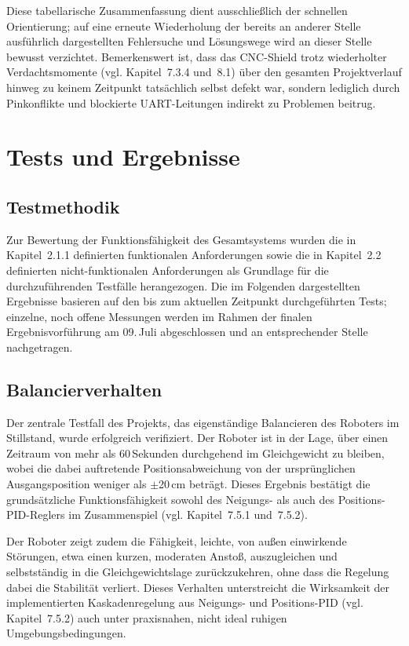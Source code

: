 \documentclass[12pt,ngerman,numbers=noenddot,abstracton,headsepline]{scrreprt}
\begin{document}
Diese tabellarische Zusammenfassung dient ausschließlich der schnellen Orientierung; auf eine erneute Wiederholung der bereits an anderer Stelle ausführlich dargestellten Fehlersuche und Lösungswege wird an dieser Stelle bewusst verzichtet. Bemerkenswert ist, dass das CNC-Shield trotz wiederholter Verdachtsmomente (vgl. Kapitel~7.3.4 und~8.1) über den gesamten Projektverlauf hinweg zu keinem Zeitpunkt tatsächlich selbst defekt war, sondern lediglich durch Pinkonflikte und blockierte UART-Leitungen indirekt zu Problemen beitrug.

\chapter{Tests und Ergebnisse}
\label{ch:tests}

\section{Testmethodik}
\label{sec:testmethodik}

Zur Bewertung der Funktionsfähigkeit des Gesamtsystems wurden die in Kapitel~2.1.1 definierten funktionalen Anforderungen sowie die in Kapitel~2.2 definierten nicht-funktionalen Anforderungen als Grundlage für die durchzuführenden Testfälle herangezogen. Die im Folgenden dargestellten Ergebnisse basieren auf den bis zum aktuellen Zeitpunkt durchgeführten Tests; einzelne, noch offene Messungen werden im Rahmen der finalen Ergebnisvorführung am 09.\,Juli abgeschlossen und an entsprechender Stelle nachgetragen.

\section{Balancierverhalten}
\label{sec:balancierverhalten}

Der zentrale Testfall des Projekts, das eigenständige Balancieren des Roboters im Stillstand, wurde erfolgreich verifiziert. Der Roboter ist in der Lage, über einen Zeitraum von mehr als 60\,Sekunden durchgehend im Gleichgewicht zu bleiben, wobei die dabei auftretende Positionsabweichung von der ursprünglichen Ausgangsposition weniger als $\pm$20\,cm beträgt. Dieses Ergebnis bestätigt die grundsätzliche Funktionsfähigkeit sowohl des Neigungs- als auch des Positions-PID-Reglers im Zusammenspiel (vgl. Kapitel~7.5.1 und~7.5.2).

Der Roboter zeigt zudem die Fähigkeit, leichte, von außen einwirkende Störungen, etwa einen kurzen, moderaten Anstoß, auszugleichen und selbstständig in die Gleichgewichtslage zurückzukehren, ohne dass die Regelung dabei die Stabilität verliert. Dieses Verhalten unterstreicht die Wirksamkeit der implementierten Kaskadenregelung aus Neigungs- und Positions-PID (vgl. Kapitel~7.5.2) auch unter praxisnahen, nicht ideal ruhigen Umgebungsbedingungen.
\end{document}
